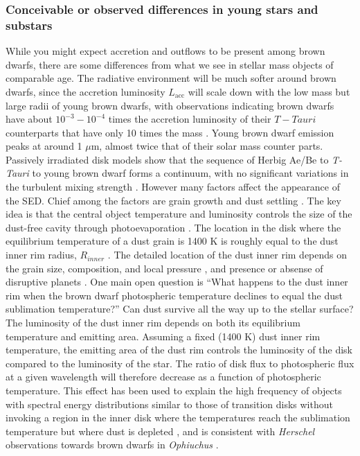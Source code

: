 \subsubsection{Conceivable or observed differences in young stars and substars}
While you might expect accretion and outflows to be present among brown dwarfs, there are some differences from what we see in stellar mass objects of comparable age.  The radiative environment will be much softer around brown dwarfs, since the accretion luminosity $L_{\mathrm{acc}}$ will scale down with the low mass but large radii of young brown dwarfs, with observations indicating brown dwarfs have about $10^{-3}-10^{-4}$ times the accretion luminosity of their $T-Tauri$ counterparts that have only 10 times the mass \citep{2004A&A...424..603N}.  Young brown dwarf emission peaks at around 1 $\mu$m, almost twice that of their solar mass counter parts.  Passively irradiated disk models \citep{2003A&A...398..607D} show that the sequence of Herbig Ae/Be to \emph{T-Tauri} to young brown dwarf forms a continuum, with no significant variations in the turbulent mixing strength \citep{2012A&A...539A...9M}. However many factors affect the appearance of the SED.  Chief among the factors are grain growth and dust settling \citep{2010ApJ...712..925C}.  The key idea is that the central object temperature and luminosity controls the size of the dust-free cavity through photoevaporation \citep{2011ARA&A..49...67W}.  The location in the disk where the equilibrium temperature of a dust grain is 1400 K is roughly equal to the dust inner rim radius, $R_{inner}$ \citep{2001ApJ...560..957D}.  The detailed location of the dust inner rim depends on the grain size, composition, and local pressure \citep{2005A&A...438..899I}, and presence or absense of disruptive planets \citep{2014prpl.conf..667B,2015arXiv150302649P}.  One main open question is ``What happens to the dust inner rim when the brown dwarf photospheric temperature declines to equal the dust sublimation temperature?''  Can dust survive all the way up to the stellar surface?  The luminosity of the dust inner rim depends on both its equilibrium temperature and emitting area.  Assuming a fixed (1400 K) dust inner rim temperature, the emitting area of the dust rim controls the luminosity of the disk compared to the luminosity of the star.  The ratio of disk flux to photospheric flux at a given wavelength will therefore decrease as a function of photospheric temperature.  This effect has been used to explain the high frequency of objects with spectral energy distributions similar to those of transition disks without invoking a region in the inner disk where the temperatures reach the sublimation temperature but where dust is depleted \citep{2009MNRAS.394L.141E}, and is consistent with \emph{Herschel} observations towards brown dwarfs in \emph{Ophiuchus} \citep{2013A&A...559A.126A}.


